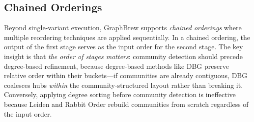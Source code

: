 \documentclass[sigconf, nonacm]{acmart}
\begin{document}
\subsection{Chained Orderings}
\label{sec:chained}
Beyond single-variant execution, GraphBrew supports \emph{chained orderings} where multiple reordering techniques are applied sequentially. In a chained ordering, the output of the first stage serves as the input order for the second stage. The key insight is that \emph{the order of stages matters}: community detection should precede degree-based refinement, because degree-based methods like DBG preserve relative order within their buckets---if communities are already contiguous, DBG coalesces hubs \emph{within} the community-structured layout rather than breaking it. Conversely, applying degree sorting before community detection is ineffective because Leiden and Rabbit Order rebuild communities from scratch regardless of the input order.
\end{document}
